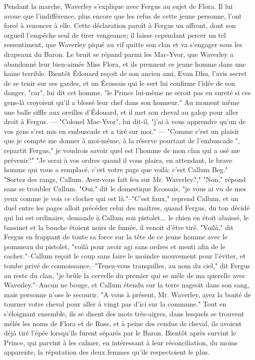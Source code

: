 {Pendant la marche, Waverley s'explique avec Fergus au sujet de Flora. Il lui avoue que l'indifférence, plus encore que les refus de cette jeune personne, l'ont forcé à renoncer à elle. Cette déclaration paroît à Fergus un affront, dont son orgueil l'empêche seul de tirer vengeance; il laisse cependant percer\setcounter{page}{362}  un tel ressentiment, que Waverley piqué au vif quitte son clan et va s'engager sous les drapeaux du Baron. Le bruit se répand parmi les Mac-Yvor, que Waverley a abandonné leur bien-aimée Miss Flora, et ils prennent ce jeune homme dans une haine terrible. Bientôt Édouard reçoit de son ancien ami, Evan Dhu, l'avis secret de se tenir sur ses gardes, et un Écossais qui le sert lui confirme l'idée de son danger, "car", lui dit cet homme, "le Prince lui-même ne seroit pas en sureté si ces gens-là croyoient qu'il a blessé leur chef dans son honneur." Au moment même une balle siffle aux oreilles d'Édouard, et il met son cheval au galop pour aller droit à Fergus. — "Colonel Mac-Yvor", lui dit-il, "j'ai à vous apprendre qu'un de vos gens s'est mis en embuscade et a tiré sur moi." — "Comme c'est un plaisir que je compte me donner à moi-même, à la réserve pourtant de l'embuscade ", repartit Fergus," je voudrois savoir quel est l'homme de mon clan qui a osé me prévenir?" "Je serai à vos ordres quand il vous plaira, en attendant, le brave homme qui vous a remplacé, c'est votre page que voilà: c'est Callum Beg." "Sortez des rangs, Callum. Avez-vous fait feu sur Mr. Waverley?,"\setcounter{page}{363} "Non," répond sans se troubler Callum.
"Oui," dit le domestique Ecossais, "je vous ai vu de mes yeux comme je vois ce clocher qui est là."--"C'est faux," reprend Callum, et un duel entre les pages alloit précéder celui des maîtres, quand Fergus, du ton décidé qui lui est ordinaire, demande à Callum son pistolet... le chien en étoit abaissé, le bassinet et la bouche étoient noirs de fumée, il venoit d'être tiré.
"Voilà," dit Fergus en frappant de toute sa force sur la tête de ce jeune homme avec le pommeau du pistolet, "voilà pour avoir agi sans ordres et menti afin de le cacher."--Callum reçoit le coup sans faire le moindre mouvement pour l'éviter, et tombe privé de connoissance.--"Tenez-vous tranquilles, au nom du ciel," dit Fergus au reste du clan, "je brûle la cervelle du premier qui se mêle de ma querelle avec Waverley."--Aucun ne bouge, et Callum étendu sur la terre nageoit dans son sang, mais personne n'ose le secourir.
"A vous à présent, Mr. Waverley, ayez la bonté de tourner votre cheval pour aller à vingt pas d'ici sur la commune." Tout en s'éloignant ensemble, ils se disent des mots très-aigres, dans lesquels se trouvent mêlés les noms de Flora et de Rose, et à peine des\setcounter{page}{364} cendus de cheval, ils avoient déjà tiré l'épée lorsqu'ils furent séparés par le Baron. Bientôt après survint le Prince, qui parvint à les calmer, en intéressant à leur réconciliation, du moins apparente, la réputation des deux femmes qu'ils respectoient le plus.
}
